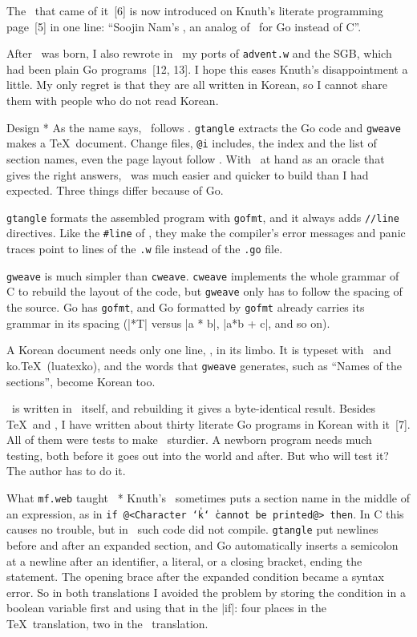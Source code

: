 The \GWEB\ that came of it~[6] is now introduced on Knuth's literate
programming page~[5] in one line: ``Soojin Nam's \GWEB, an analog of
\CWEB\ for Go instead of C''.

After \GWEB\ was born, I also rewrote in \GWEB\ my ports of
{\tt advent.w} and the SGB, which had been plain Go programs~[12, 13].
I hope this eases Knuth's disappointment a little. My only regret is
that they are all written in Korean, so I cannot share them with people
who do not read Korean.

\subhead * Design *
As the name says, \GWEB\ follows \CWEB. {\tt gtangle} extracts the Go
code and {\tt gweave} makes a \TeX\ document. Change files, {\tt @i}
includes, the index and the list of section names, even the page
layout follow \CWEB. With \CWEB\ at hand as an oracle that gives the
right answers, \GWEB\ was much easier and quicker to build than I had
expected. Three things differ because of Go.

\list\raggedright
\item {\tt gtangle} formats the assembled program with {\tt gofmt},
and it always adds {\tt //line} directives. Like the {\tt \#line} of
\CWEB, they make the compiler's error messages and panic traces point
to lines of the {\tt .w} file instead of the {\tt .go} file.
\item {\tt gweave} is much simpler than {\tt cweave}. {\tt cweave}
implements the whole grammar of C to rebuild the layout of the code,
but {\tt gweave} only has to follow the spacing of the source. Go has
{\tt gofmt}, and Go formatted by {\tt gofmt} already carries its
grammar in its spacing (|*T| versus |a * b|, |a*b + c|, and so on).
\item A Korean document needs only one line, , in
its limbo. It is typeset with \LuaTeX\ and ko.\TeX\ (luatexko), and
the words that {\tt gweave} generates, such as ``Names of the
sections'', become Korean too.
\endlist

\GWEB\ is written in \GWEB\ itself, and rebuilding it gives a
byte-identical result. Besides \TeX\ and \MF, I have written
about thirty literate Go programs in Korean with it~[7]. All of them
were tests to make \GWEB\ sturdier. A newborn program needs much
testing, both before it goes out into the world and after. But who
will test it? The author has to do it.

\subhead * What {\tt mf.web} taught \GWEB\ *
Knuth's \WEB\ sometimes puts a section name in the middle of an
expression, as in {\tt if @<Character \char`\|k\char`\|\ cannot be
printed@> then}. In
C this causes no trouble, but in \GWEB\ such code did not compile.
{\tt gtangle} put newlines before and after an expanded section, and
Go automatically inserts a semicolon at a newline after an identifier,
a literal, or a closing bracket, ending the statement. The opening
brace after the expanded condition became a syntax error. So in both
translations I avoided the problem by storing the condition in a
boolean variable first and using that in the |if|: four places in the
\TeX\ translation, two in the \MF\ translation.


